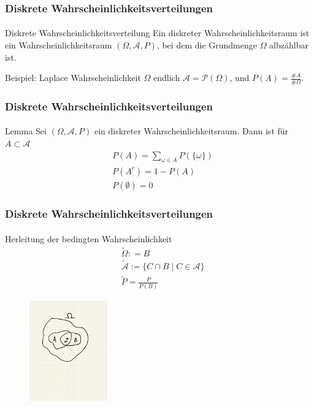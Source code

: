 \documentclass{beamer}
\begin{document}
\begin{frame}
    \frametitle{Diskrete Wahrscheinlichkeitsverteilungen}
\framesubtitle{}
\begin{block}{Diskrete Wahrscheinlichkeitsverteilung}
Ein diskreter Wahrscheinlichkeitsraum ist ein Wahrscheinlichkeitsraum $(\Omega, \mathcal{A}, P)$, bei dem die Grundmenge $\Omega$ albzählbar ist.
\end{block}
\begin{block}{Beispiel: Laplace Wahrscheinlichkeit}
$\Omega$ endlich $ \mathcal{A} = \mathcal{P}(\Omega)$,  und $P(A) = \frac{\#A}{\#\Omega}$.
\end{block}

 \end{frame}



\begin{frame}
    \frametitle{Diskrete Wahrscheinlichkeitsverteilungen}
\framesubtitle{}

\begin{block}{Lemma}
Sei $(\Omega, \mathcal{A}, P)$ ein diskreter Wahrscheinlichkeitsraum. Dann ist für $A \subset \mathcal{A}$ 
\begin{align*}
& P(A) = \sum_{\omega \in A} P(\{ \omega \}) \\
& P(A^c) = 1 - P(A) \\
& P(\emptyset) = 0
\end{align*}

\end{block}

 \end{frame}







\begin{frame}
    \frametitle{Diskrete Wahrscheinlichkeitsverteilungen}
\framesubtitle{}

\begin{block}{Herleitung der bedingten  Wahrscheinlichkeit}
\begin{align*}
& \tilde{\Omega} : = B \\
& \tilde{\mathcal{A}} := \{ C \cap B  \; | \;  C \in \mathcal{A} \}  \\
& \tilde{P} = \frac{P }{P(B)}
\end{align*}
\end{block}


\begin{figure}[htp]
      \centering
    \includegraphics[width=0.3\textwidth]{img/bedingtewkeit}
\end{figure}

 \end{frame}
\end{document}
